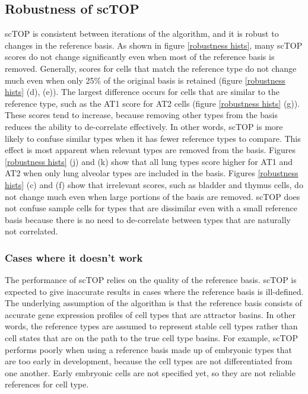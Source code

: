 \documentclass[aps,superscriptaddress, notitlepage,longbibliography]{revtex4-1}
\begin{document}
\subsection{Robustness of scTOP}
scTOP is consistent between iterations of the algorithm, and it is robust to changes in the reference basis. As shown in figure \ref{robustness hists}, many scTOP scores do not change significantly even when most of the reference basis is removed. Generally, scores for cells that match the reference type do not change much even when only 25\% of the original basis is retained (figure \ref{robustness hists} (d), (e)). The largest difference occurs for cells that are similar to the reference type, such as the AT1 score for AT2 cells (figure \ref{robustness hists} (g)). These scores tend to increase, because removing other types from the basis reduces the ability to de-correlate effectively. In other words, scTOP is more likely to confuse similar types when it has fewer reference types to compare. This effect is most apparent when relevant types are removed from the basis. Figures \ref{robustness hists} (j) and (k) show that all lung types score higher for AT1 and AT2 when only lung alveolar types are included in the basis. Figures \ref{robustness hists} (c) and (f) show that irrelevant scores, such as bladder and thymus cells, do not change much even when large portions of the basis are removed. scTOP does not confuse sample cells for types that are dissimilar even with a small reference basis because there is no need to de-correlate between types that are naturally not correlated.

\subsubsection{Cases where it doesn't work}\label{failure_cases}
The performance of scTOP relies on the quality of the reference basis. scTOP is expected to give inaccurate results in cases where the reference basis is ill-defined. The underlying assumption of the algorithm is that the reference basis consists of accurate gene expression profiles of cell types that are attractor basins. In other words, the reference types are assumed to represent stable cell types rather than cell states that are on the path to the true cell type basins. For example, scTOP performs poorly when using a reference basis made up of embryonic types that are too early in development, because the cell types are not differentiated from one another. Early embryonic cells are not specified yet, so they are not reliable references for cell type.
\end{document}
